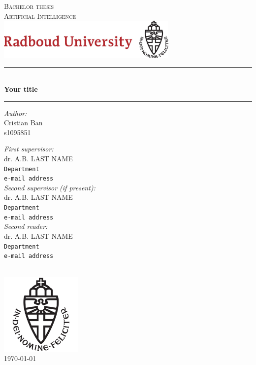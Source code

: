 \documentclass[11pt,a4paper]{report}
\begin{document}
\begin{titlepage}
\begin{center}
\textsc{\LARGE Bachelor thesis}\\ [0.5cm]
\textsc{ \LARGE Artificial Intelligence}\\[0.5cm]
\includegraphics[height=2cm]{RU_Text_&_Logo.jpg}

\vspace{0.4cm}
\hrule \text{}\\[0.4cm]
\textbf{\huge Your title 
}\\[0.4cm]
\hrule
\vspace{2cm}
\begin{minipage}[t]{0.45\textwidth}
\begin{flushleft} \large
\textit{Author:}\\
Cristian Ban\\
s1095851
\end{flushleft}
\end{minipage}
\begin{minipage}[t]{0.45\textwidth}
\begin{flushright} \large
\textit{First supervisor:}\\
dr. A.B. LAST NAME\\
\texttt{Department}\\
\texttt{e-mail address}\\[1.0cm]
\textit{Second supervisor (if present):}\\
dr. A.B. LAST NAME\\
\texttt{Department}\\
\texttt{e-mail address}\\[1.0cm]
\textit{Second reader:}\\
dr. A.B. LAST NAME\\
\texttt{Department}\\
\texttt{e-mail address}\\[1.3cm]
\end{flushright}
\end{minipage}\\[1cm]
\includegraphics[width=4cm]{Imgs/RU_Logo.png}\\[0.5cm]
{\large \today}
\end{center}
\end{titlepage}
\end{document}
